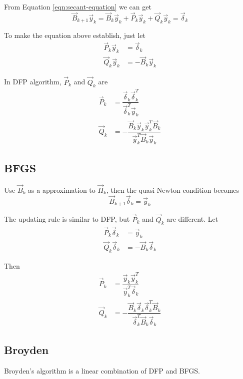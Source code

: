 From Equation \eqref{eqn:secant-equation} we can get
\begin{equation*}
\vec{B}_{k+1}\vec{y}_k=\vec{B}_k\vec{y}_k+\vec{P}_k\vec{y}_k+\vec{Q}_k\vec{y}_k=\vec{\delta}_k
\end{equation*}

To make the equation above establish, just let
\begin{align*}
\vec{P}_k\vec{y}_k & = \vec{\delta}_k \\
\vec{Q}_k\vec{y}_k & = -\vec{B}_k\vec{y}_k
\end{align*}

In DFP algorithm, $\vec{P}_k$ and $\vec{Q}_k$ are
\begin{align}
\vec{P}_k &= \dfrac{\vec{\delta}_k\vec{\delta}_k^T}{\vec{\delta}_k^T\vec{y}_k} \\
\vec{Q}_k &= -\dfrac{\vec{B}_k\vec{y}_k\vec{y}_k^T\vec{B}_k}{\vec{y}_k^T\vec{B}_k\vec{y}_k}
\end{align}


\subsection{BFGS}
Use $\vec{B}_k$ as a approximation to $\vec{H}_k$, then the quasi-Newton condition becomes
\begin{equation}
\vec{B}_{k+1}\vec{\delta}_k=\vec{y}_k
\end{equation}

The updating rule is similar to DFP, but $\vec{P}_k$ and $\vec{Q}_k$ are different. Let 
\begin{align*}
\vec{P}_k\vec{\delta}_k & = \vec{y}_k \\
\vec{Q}_k\vec{\delta}_k & = -\vec{B}_k\vec{\delta}_k
\end{align*}

Then
\begin{align}
\vec{P}_k &= \dfrac{\vec{y}_k\vec{y}_k^T}{\vec{y}_k^T\vec{\delta}_k} \\
\vec{Q}_k &= -\dfrac{\vec{B}_k\vec{\delta}_k\vec{\delta}_k^T\vec{B}_k}{\vec{\delta}_k^T\vec{B}_k\vec{\delta}_k}
\end{align}


\subsection{Broyden}
Broyden's algorithm is a linear combination of DFP and BFGS.
